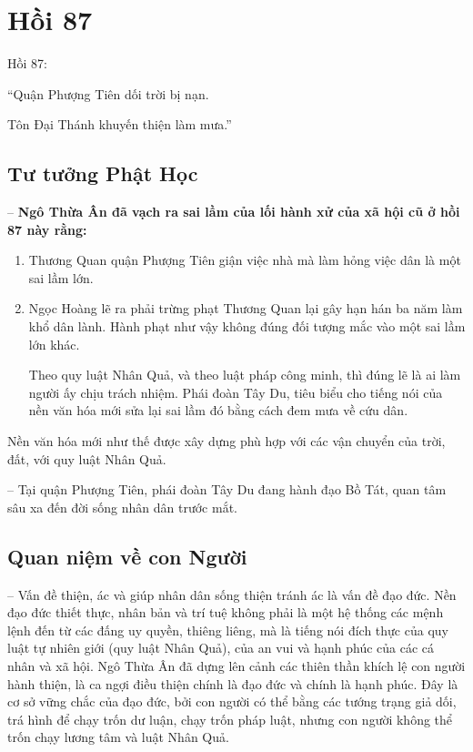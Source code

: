 \chapter{Hồi 87} %
\label{cha:hoi_87}

Hồi 87:

\begin{itshape}
``Quận Phượng Tiên dối trời bị nạn.

Tôn Đại Thánh khuyến thiện làm mưa.''
\end{itshape}

\section{Tư tưởng Phật Học} %
\label{sec:87_phat_hoc}

-- {\bf Ngô Thừa Ân đã vạch ra sai lầm của lối hành xử của xã hội cũ ở hồi 87 này rằng:}

\begin{enumerate}[label=\itshape\arabic*\upshape/]
    \item Thương Quan quận Phượng Tiên giận việc nhà mà làm hỏng việc dân là một sai lầm lớn.

    \item Ngọc Hoàng lẽ ra phải trừng phạt Thương Quan lại gây hạn hán ba năm làm khổ dân lành. Hành phạt như vậy không đúng đối tượng mắc vào một sai lầm lớn khác.

    Theo quy luật Nhân Quả, và theo luật pháp công minh, thì đúng lẽ là ai làm người ấy chịu trách nhiệm. Phái đoàn Tây Du, tiêu biểu cho tiếng nói của nền văn hóa mới sửa lại sai lầm đó bằng cách đem mưa về cứu dân.
\end{enumerate}

Nền văn hóa mới như thế được xây dựng phù hợp với các vận chuyển của trời, đất, với quy luật Nhân Quả.

-- Tại quận Phượng Tiên, phái đoàn Tây Du đang hành đạo Bồ Tát, quan tâm sâu xa đến đời sống nhân dân trước mắt.

\section{Quan niệm về con Người} %
\label{sec:87_con_nguoi}

-- Vấn đề thiện, ác và giúp nhân dân sống thiện tránh ác là vấn đề đạo đức. Nền đạo đức thiết thực, nhân bản và trí tuệ không phải là một hệ thống các mệnh lệnh đến từ các đấng uy quyền, thiêng liêng, mà là tiếng nói đích thực của quy luật tự nhiên giới (quy luật Nhân Quả), của an vui và hạnh phúc của các cá nhân và xã hội. Ngô Thừa Ân đã dựng lên cảnh các thiên thần khích lệ con người hành thiện, là ca ngợi điều thiện chính là đạo đức và chính là hạnh phúc. Đây là cơ sở vững chắc của đạo đức, bởi con người có thể bằng các tướng trạng giả dối, trá hình để chạy trốn dư luận, chạy trốn pháp luật, nhưng con người không thể trốn chạy lương tâm và luật Nhân Quả.

